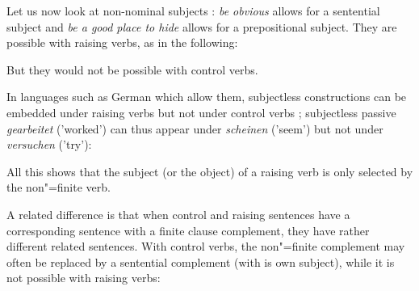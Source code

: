 \documentclass[output=paper
	        ,collection
	        ,collectionchapter
 	        ,biblatex
                ,babelshorthands
                ,newtxmath
                ,draftmode
                ,colorlinks, citecolor=brown
]{langscibook}
\begin{document}
\eal
\judgewidth{\#}
 \label{cat1}
 \label{cat2}
 \label{cat3}
 \label{cat4}
\zl

Let us now look at non-nominal subjects : \emph{be obvious} allows for a sentential subject and \emph{be a good place to hide} allows for a prepositional subject. They are possible with raising verbs, as in the following:
 
\eal 
{}
 \label{under}
\zl

But they would not be possible with control verbs.
\eal
{}
\zl

In languages such as German which allow them, subjectless constructions can be embedded under
raising verbs but not under control verbs \citep[]{Mueller2002b}; subjectless passive \emph{gearbeitet} ('worked') can thus appear under \emph{scheinen} ('seem') but not under \emph{versuchen} ('try'):

\eal
\label{german1}
\zl
 
 All this shows that the subject (or the object) of a raising verb is only selected by the non"=finite verb. 

A related difference is that when control and raising sentences have a corresponding sentence with a finite clause complement, they have rather different related sentences.
With control verbs, the non"=finite complement may often be replaced by a sentential complement (with is own subject), while it is not possible with raising verbs:
\end{document}
